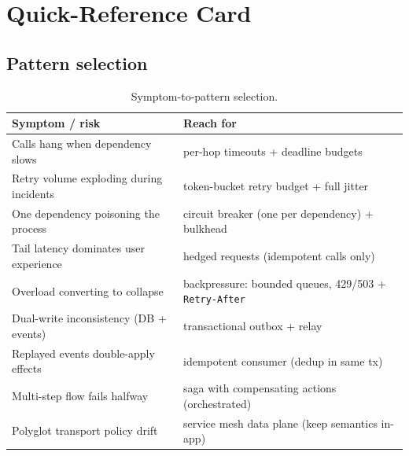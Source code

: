 
\section{Quick-Reference Card}
\label{sec:ch15-quickref}

\subsection*{Pattern selection}
\begin{table}[h]
  \centering
  \small
  \begin{tabularx}{\textwidth}{l X}
    \toprule
    \textbf{Symptom / risk} & \textbf{Reach for} \\
    \midrule
    Calls hang when dependency slows & per-hop timeouts + deadline budgets \\
    Retry volume exploding during incidents & token-bucket retry budget + full jitter \\
    One dependency poisoning the process & circuit breaker (one per dependency) + bulkhead \\
    Tail latency dominates user experience & hedged requests (idempotent calls only) \\
    Overload converting to collapse & backpressure: bounded queues, 429/503 + \texttt{Retry-After} \\
    Dual-write inconsistency (DB + events) & transactional outbox + relay \\
    Replayed events double-apply effects & idempotent consumer (dedup in same tx) \\
    Multi-step flow fails halfway & saga with compensating actions (orchestrated) \\
    Polyglot transport policy drift & service mesh data plane (keep semantics in-app) \\
    \bottomrule
  \end{tabularx}
  \caption{Symptom-to-pattern selection.}
  \label{tab:ch15-pattern-select}
\end{table}

